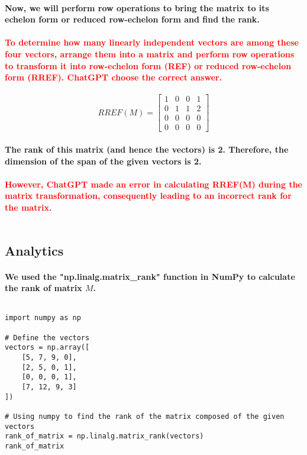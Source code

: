 \documentclass[11pt]{article} %
\begin{document}
\begin{mdframed}
    \paragraph{Now, we will perform row operations to bring the matrix to its echelon form or reduced row-echelon form and find the rank.}
    \paragraph{\textcolor{red}{To determine how many linearly independent vectors are among these four vectors, arrange them into a matrix and perform row operations to transform it into row-echelon form (REF) or reduced row-echelon form (RREF). ChatGPT choose the correct answer.}}
    \[ RREF(M) = \begin{bmatrix}
            1 & 0 & 0 & 1 \\
            0 & 1 & 1 & 2 \\
            0 & 0 & 0 & 0 \\
            0 & 0 & 0 & 0
        \end{bmatrix} \]

    \paragraph{The rank of this matrix (and hence the vectors) is 2. Therefore, the dimension of the span of the given vectors is 2.}
    \paragraph{\textcolor{red}{However, ChatGPT made an error in calculating RREF(M) during the matrix transformation, consequently leading to an incorrect rank for the matrix.}}
    $$$$

\end{mdframed}
% 
% 
% 
% 
% 
% 
% 
% 
% 
% 
% 
% 
\subsection{Analytics}
% 
% 
% 
\paragraph{We used the "np.linalg.matrix\_rank" function in NumPy to calculate the rank of matrix \(M\).}
% 
$$$$
% 
% 
\begin{lstlisting}[style=pystyle]
import numpy as np

# Define the vectors
vectors = np.array([
    [5, 7, 9, 0],
    [2, 5, 0, 1],
    [0, 0, 0, 1],
    [7, 12, 9, 3]
])

# Using numpy to find the rank of the matrix composed of the given vectors
rank_of_matrix = np.linalg.matrix_rank(vectors)
rank_of_matrix
\end{lstlisting}
% 
% 
% 
% 
% 
\end{document}
